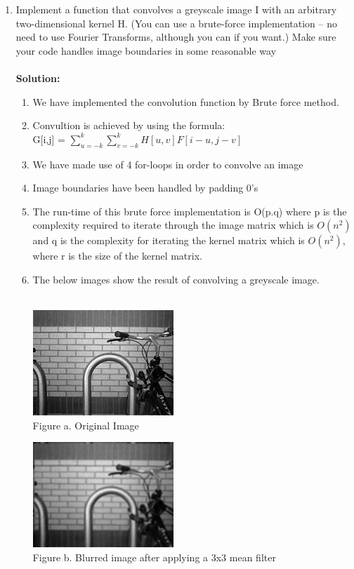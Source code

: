 \documentclass{article}
\begin{document}
	\pagestyle{plain}
	\begin{enumerate}
		\item Implement a function that convolves a greyscale image I with an arbitrary two-dimensional kernel H.
		(You can use a brute-force implementation – no need to use Fourier Transforms, although you can if you want.) Make sure your code handles image boundaries in some reasonable way \\ \\
		\textbf{Solution:}
		\begin{enumerate}
			\item We have implemented the convolution function by Brute force method.
			\item Convultion is achieved by using the formula: \\G[i,j] = $\sum\limits_{u=-k}^k \sum\limits_{v=-k}^k H[u,v] F[i-u,j-v]$ 
			\item We have made use of 4 for-loops in order to convolve an image
			\item Image boundaries have been handled by padding 0's
			\item The run-time of this brute force implementation is O(p.q) where p is the complexity required to iterate through the image matrix which is $O(n^2)$ and q is the complexity for iterating the kernel matrix which is $O(n^2)$, where r is the size of the kernel matrix.
			
			\item The below images show the  result of convolving a greyscale image. \\ \\
			\begin{center}
				\includegraphics{Bikesgray.png} \\
				Figure a. Original Image
			\end{center}
			\begin{center}
				\includegraphics{detected_test.png}	\\	
				Figure b. Blurred image after applying a 3x3 mean filter \\
			\end{center} 
		\end{enumerate}
		

\end{enumerate}
\end{document}
